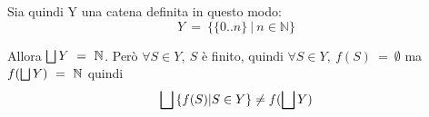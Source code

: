 {    Sia quindi Y una catena definita in questo modo:
    \[
    Y~=~\{\{0..n\}~|~n\in\mathbb{N}\}
    \]

    Allora $\bigsqcup{}Y~=~\mathbb{N}$. Però $\forall{}S\in{}Y,~S$ è finito, quindi
    $\forall{}S\in{}Y,~f(S)~=~\emptyset$ ma $f(\bigsqcup{}Y)~=~\mathbb{N}$ quindi 
    \[\bigsqcup{} \{f(S) | S \in{}Y\} \neq f(\bigsqcup{}Y)\]
%
}
\newpage